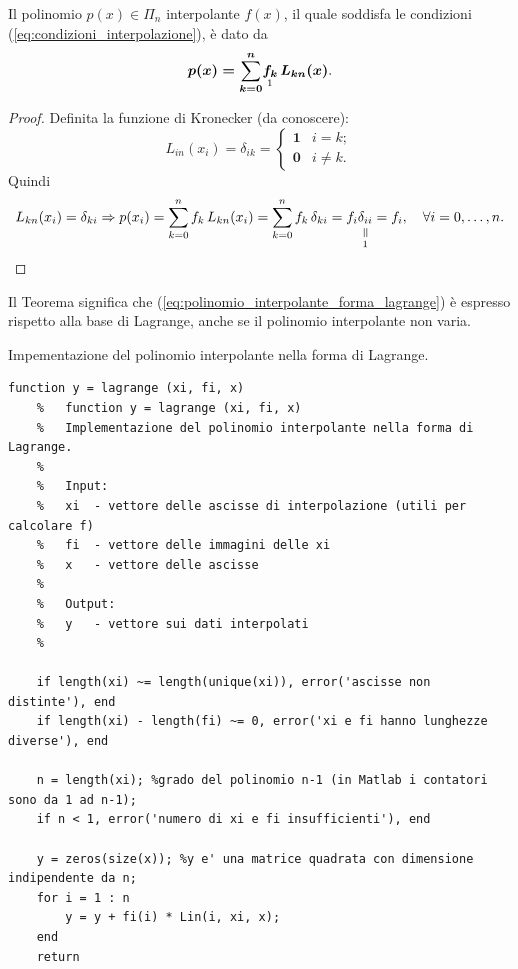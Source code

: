 \begin{theorem}
    Il polinomio $p(x)\in \Pi_n$ interpolante $f(x)$, il quale soddisfa le condizioni (\ref{eq:condizioni_interpolazione}), è dato da 
    \begin{equation}\label{eq:polinomio_interpolante_forma_lagrange}
        \boldsymbol{p(x)=\sum_{k=0}^{n}} \underset{\footnotemark}{\boldsymbol{f_k}}\, \boldsymbol{L_{kn}(x)}.
    \end{equation}
\end{theorem}
\begin{proof}
    Definita la funzione di Kronecker (da conoscere): 
    \begin{equation}\label{eq:formaKronecker}
        L_{in}(x_i)=\delta_{ik} = 
        \begin{cases}
            \boldsymbol 1 & i=k;\\
            \boldsymbol 0 & i\neq k.
        \end{cases}
    \end{equation}
   Quindi
   \begin{equation*}
       L_{kn}(x_i)=\delta_{ki}\Rightarrow p(x_i)=\sum_{k=0}^n f_k\, L_{kn}(x_i) = \sum_{k=0}^n f_k\, \delta_{ki} = f_i \equalto{\delta_{ii}}{1} = f_i,\quad \forall i=0,\hdots,n.
   \end{equation*}
\end{proof}

Il Teorema  significa che (\ref{eq:polinomio_interpolante_forma_lagrange}) è espresso rispetto alla base di Lagrange, anche se il polinomio interpolante non varia.

\begin{algorithm}
\caption{Impementazione del polinomio interpolante nella forma di Lagrange.}\label{alg:calcolo_polinomio_interpolante_forma_lagrange}
    \begin{lstlisting}[style=Matlab-editor]
    function y = lagrange (xi, fi, x)
    %   function y = lagrange (xi, fi, x)
    %   Implementazione del polinomio interpolante nella forma di Lagrange.
    %
    %   Input:
    %   xi  - vettore delle ascisse di interpolazione (utili per calcolare f)
    %   fi  - vettore delle immagini delle xi
    %   x   - vettore delle ascisse
    %
    %   Output:
    %   y   - vettore sui dati interpolati
    %
    
    if length(xi) ~= length(unique(xi)), error('ascisse non distinte'), end
    if length(xi) - length(fi) ~= 0, error('xi e fi hanno lunghezze diverse'), end
    
    n = length(xi); %grado del polinomio n-1 (in Matlab i contatori sono da 1 ad n-1);
    if n < 1, error('numero di xi e fi insufficienti'), end 
    
    y = zeros(size(x)); %y e' una matrice quadrata con dimensione indipendente da n;
    for i = 1 : n
        y = y + fi(i) * Lin(i, xi, x);
    end
    return
    \end{lstlisting}
\end{algorithm}

